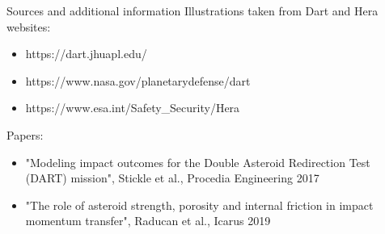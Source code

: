 \documentclass{beamer}
\begin{document}
\begin{frame}{Sources and additional information}
	Illustrations taken from Dart and Hera websites:
\begin{itemize}
	\item https://dart.jhuapl.edu/ 
	\item https://www.nasa.gov/planetarydefense/dart
	\item https://www.esa.int/Safety\_Security/Hera
\end{itemize} 
	Papers:
\begin{itemize}
	\item "Modeling impact outcomes for the Double Asteroid Redirection Test (DART) mission", Stickle et al., Procedia Engineering 2017
	\item "The role of asteroid strength, porosity and internal friction in impact momentum transfer", Raducan et al., Icarus 2019
\end{itemize} 
\end{frame}
\end{document}
